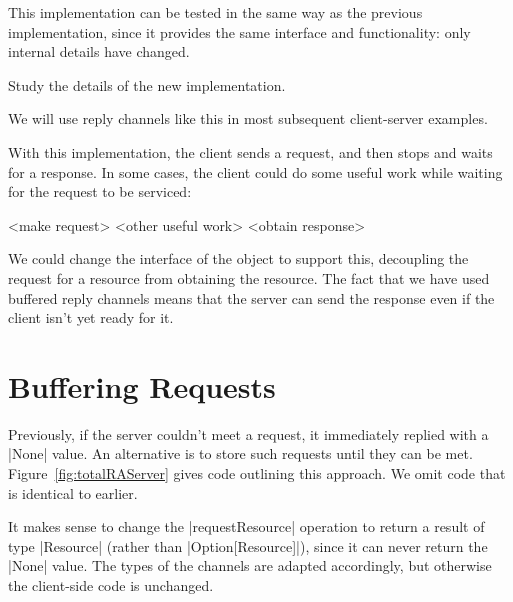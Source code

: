 
This implementation can be tested in the same way as the previous
implementation, since it provides the same interface and functionality: only
internal details have changed. 

\begin{instruction}
Study the details of the new implementation.
\end{instruction}

We will use reply channels like this in most subsequent client-server
examples. 

With this implementation, the client sends a request, and then stops and waits
for a response.  In some cases, the client could do some useful work while
waiting for the request to be serviced:
%
\begin{scala}
  <make request>
  <other useful work>
  <obtain response>
\end{scala}
%
We could change the interface of the object to support this, decoupling the
request for a resource from obtaining the resource.
The fact that we have used buffered reply channels means that the server can
send the response even if the client isn't yet ready for it.  


\section{Buffering Requests}

Previously, if the server couldn't meet a request, it immediately replied with
a |None| value.  An alternative is to store such requests until they can be
met.  
%
Figure~\ref{fig:totalRAServer} gives code outlining this approach.  We omit
code that is identical to earlier.

It makes sense to change the |requestResource| operation to return a result of
type |Resource| (rather than |Option[Resource]|), since it can never return
the |None| value.  The types of the channels are adapted accordingly, but
otherwise the client-side code is unchanged.


